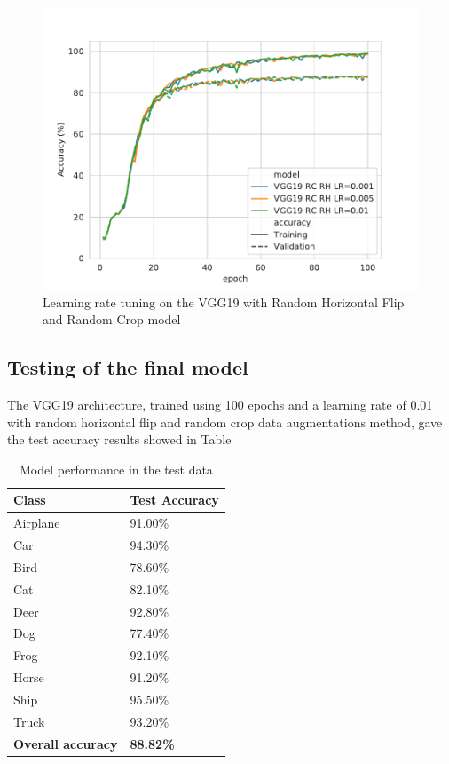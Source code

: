 \documentclass[10pt,twocolumn,letterpaper]{article}
\begin{document}
\begin{figure}[h]
	\begin{center}
		\includegraphics[width=1.0\linewidth]{vgg19_lr.pdf}
	\end{center}
	\caption{Learning rate tuning on the VGG19 with Random Horizontal Flip and Random Crop model}
	\label{fig:lr}
\end{figure}

\subsection{Testing of the final model}

The VGG19 architecture, trained using 100 epochs and a learning rate of 0.01 with random horizontal flip and random crop data augmentations method, gave the test accuracy results showed in Table 

\begin{table}[h]
	\begin{center}
		\begin{tabular}{|p{3cm}|p{2.5cm}|}
			\hline
			Class & Test Accuracy \\
			\hline\hline
			Airplane & 91.00\%  \\
			Car & 94.30\% \\
			Bird & 78.60\% \\
			Cat & 82.10\% \\
			Deer & 92.80\%  \\
			Dog & 77.40\% \\
			Frog & 92.10\% \\
			Horse & 91.20\% \\
			Ship & 95.50\% \\
			Truck & 93.20\% \\
			\textbf{Overall accuracy} & \textbf{88.82\%} \\
			\hline
		\end{tabular}
	\end{center}
	\caption{Model performance in the test data}
	\label{table:test}
\end{table}
\end{document}
